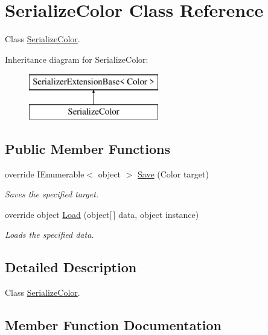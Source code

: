 \hypertarget{class_serialize_color}{}\section{Serialize\+Color Class Reference}
\label{class_serialize_color}


Class \hyperlink{class_serialize_color}{Serialize\+Color}.  


Inheritance diagram for Serialize\+Color\+:\begin{figure}[H]
\begin{center}
\leavevmode
\includegraphics[height=2.000000cm]{class_serialize_color}
\end{center}
\end{figure}
\subsection*{Public Member Functions}
\begin{DoxyCompactItemize}
\item 
override I\+Enumerable$<$ object $>$ \hyperlink{class_serialize_color_aab21b448e72e3474845cc3120ea4e34c}{Save} (Color target)
\begin{DoxyCompactList}\small\item\em Saves the specified target. \end{DoxyCompactList}\item 
override object \hyperlink{class_serialize_color_ae959d6e7f4466e158d7ee4d23849a7ca}{Load} (object\mbox{[}$\,$\mbox{]} data, object instance)
\begin{DoxyCompactList}\small\item\em Loads the specified data. \end{DoxyCompactList}\end{DoxyCompactItemize}


\subsection{Detailed Description}
Class \hyperlink{class_serialize_color}{Serialize\+Color}. 



\subsection{Member Function Documentation}
\mbox{\label{class_serialize_color_ae959d6e7f4466e158d7ee4d23849a7ca}} 
